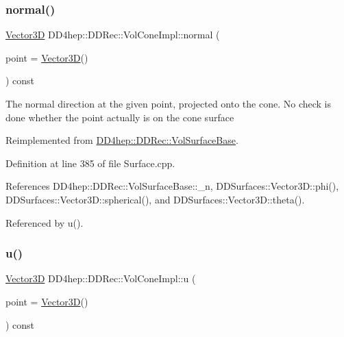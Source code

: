 \subsubsection{\texorpdfstring{normal()}{normal()}}
{\footnotesize\ttfamily \hyperlink{class_d_d_surfaces_1_1_vector3_d}{Vector3D} D\+D4hep\+::\+D\+D\+Rec\+::\+Vol\+Cone\+Impl\+::normal (\begin{DoxyParamCaption}\item[{const \hyperlink{class_d_d_surfaces_1_1_vector3_d}{Vector3D} \&}]{point = {\ttfamily \hyperlink{class_d_d_surfaces_1_1_vector3_d}{Vector3D}()} }\end{DoxyParamCaption}) const\hspace{0.3cm}{\ttfamily [virtual]}}

The normal direction at the given point, projected onto the cone. No check is done whether the point actually is on the cone surface 

Reimplemented from \hyperlink{class_d_d4hep_1_1_d_d_rec_1_1_vol_surface_base_a247a1503e7265c3a9e4a6a17df2c58e4}{D\+D4hep\+::\+D\+D\+Rec\+::\+Vol\+Surface\+Base}.



Definition at line 385 of file Surface.\+cpp.



References D\+D4hep\+::\+D\+D\+Rec\+::\+Vol\+Surface\+Base\+::\+\_\+n, D\+D\+Surfaces\+::\+Vector3\+D\+::phi(), D\+D\+Surfaces\+::\+Vector3\+D\+::spherical(), and D\+D\+Surfaces\+::\+Vector3\+D\+::theta().



Referenced by u().

\hypertarget{class_d_d4hep_1_1_d_d_rec_1_1_vol_cone_impl_a6e9da4a465f95d8579fb579a7ef1236c}{}\label{class_d_d4hep_1_1_d_d_rec_1_1_vol_cone_impl_a6e9da4a465f95d8579fb579a7ef1236c} 
\subsubsection{\texorpdfstring{u()}{u()}}
{\footnotesize\ttfamily \hyperlink{class_d_d_surfaces_1_1_vector3_d}{Vector3D} D\+D4hep\+::\+D\+D\+Rec\+::\+Vol\+Cone\+Impl\+::u (\begin{DoxyParamCaption}\item[{const \hyperlink{class_d_d_surfaces_1_1_vector3_d}{Vector3D} \&}]{point = {\ttfamily \hyperlink{class_d_d_surfaces_1_1_vector3_d}{Vector3D}()} }\end{DoxyParamCaption}) const\hspace{0.3cm}{\ttfamily [virtual]}}

